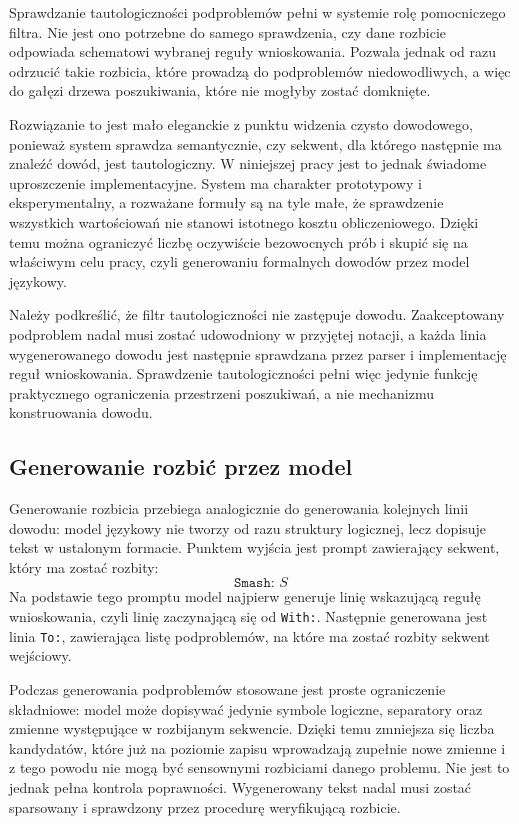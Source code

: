\documentclass[shortabstract]{iithesis}
\theoremstyle{definition}
\theoremstyle{remark}
\theoremstyle{plain}
\begin{document}
Sprawdzanie tautologiczności podproblemów pełni w systemie rolę pomocniczego
filtra. Nie jest ono potrzebne do samego sprawdzenia, czy dane rozbicie odpowiada
schematowi wybranej reguły wnioskowania. Pozwala jednak od razu odrzucić takie
rozbicia, które prowadzą do podproblemów niedowodliwych, a więc do gałęzi drzewa
poszukiwania, które nie mogłyby zostać domknięte.

Rozwiązanie to jest mało eleganckie z punktu widzenia czysto dowodowego, ponieważ
system sprawdza semantycznie, czy sekwent, dla którego następnie ma znaleźć dowód,
jest tautologiczny. W niniejszej pracy jest to jednak świadome uproszczenie
implementacyjne. System ma charakter prototypowy i eksperymentalny, a rozważane
formuły są na tyle małe, że sprawdzenie wszystkich wartościowań nie stanowi
istotnego kosztu obliczeniowego. Dzięki temu można ograniczyć liczbę oczywiście
bezowocnych prób i skupić się na właściwym celu pracy, czyli generowaniu formalnych
dowodów przez model językowy.

Należy podkreślić, że filtr tautologiczności nie zastępuje dowodu. Zaakceptowany
podproblem nadal musi zostać udowodniony w przyjętej notacji, a każda linia
wygenerowanego dowodu jest następnie sprawdzana przez parser i implementację
reguł wnioskowania. Sprawdzenie tautologiczności pełni więc jedynie funkcję
praktycznego ograniczenia przestrzeni poszukiwań, a nie mechanizmu konstruowania
dowodu.


\subsection{Generowanie rozbić przez model}

Generowanie rozbicia przebiega analogicznie do generowania kolejnych linii dowodu:
model językowy nie tworzy od razu struktury logicznej, lecz dopisuje tekst w ustalonym
formacie. Punktem wyjścia jest prompt zawierający sekwent, który ma zostać rozbity:
\[
\texttt{Smash: } S
\]
Na podstawie tego promptu model najpierw generuje linię wskazującą regułę
wnioskowania, czyli linię zaczynającą się od \texttt{With:}. Następnie generowana jest
linia \texttt{To:}, zawierająca listę podproblemów, na które ma zostać rozbity sekwent
wejściowy.

Podczas generowania podproblemów stosowane jest proste ograniczenie składniowe:
model może dopisywać jedynie symbole logiczne, separatory oraz zmienne występujące
w rozbijanym sekwencie. Dzięki temu zmniejsza się liczba kandydatów, które już na
poziomie zapisu wprowadzają zupełnie nowe zmienne i z tego powodu nie mogą być
sensownymi rozbiciami danego problemu. Nie jest to jednak pełna kontrola poprawności.
Wygenerowany tekst nadal musi zostać sparsowany i sprawdzony przez procedurę
weryfikującą rozbicie.
\end{document}
